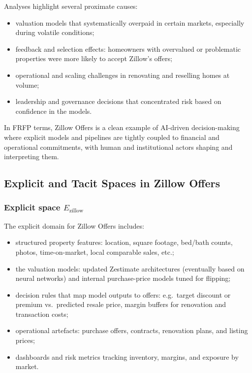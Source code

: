 Analyses highlight several proximate causes:

\begin{itemize}
  \item valuation models that systematically overpaid in certain markets,
        especially during volatile conditions;
  \item feedback and selection effects: homeowners with overvalued or
        problematic properties were more likely to accept Zillow’s offers;
  \item operational and scaling challenges in renovating and reselling homes
        at volume;
  \item leadership and governance decisions that concentrated risk
        based on confidence in the models.
\end{itemize}

In FRFP terms, Zillow Offers is a clean example of AI-driven decision-making
where explicit models and pipelines are tightly coupled to financial and
operational commitments, with human and institutional actors shaping and
interpreting them.

\subsection{Explicit and Tacit Spaces in Zillow Offers}

\subsubsection*{Explicit space \(E_{\mathrm{zillow}}\)}

The explicit domain for Zillow Offers includes:

\begin{itemize}
  \item structured property features:
        location, square footage, bed/bath counts, photos, time-on-market,
        local comparable sales, etc.;
  \item the valuation models:
        updated Zestimate architectures (eventually based on neural networks)
        and internal purchase-price models tuned for flipping;
  \item decision rules that map model outputs to offers:
        e.g.\ target discount or premium vs.\ predicted resale price, margin
        buffers for renovation and transaction costs;
  \item operational artefacts:
        purchase offers, contracts, renovation plans, and listing prices;
  \item dashboards and risk metrics tracking inventory, margins,
        and exposure by market.
\end{itemize}


